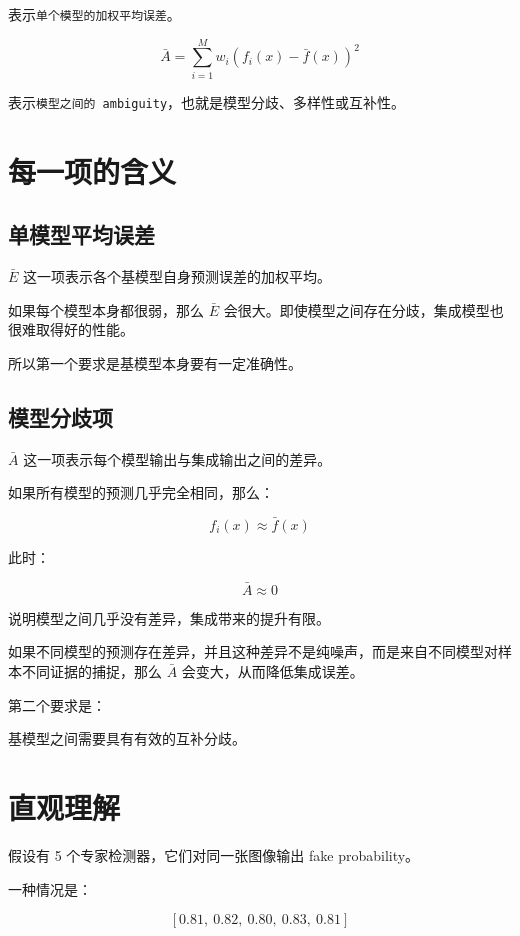 表示\verb|单个模型的加权平均误差|。

\[
\bar{A} = \sum_{i=1}^{M} w_i\left(f_i(x)-\bar{f}(x)\right)^2
\]

表示\verb|模型之间的 ambiguity|，也就是模型分歧、多样性或互补性。

\section{每一项的含义}

\subsection{单模型平均误差}

\(\bar{E}\) 这一项表示各个基模型自身预测误差的加权平均。

如果每个模型本身都很弱，那么 \(\bar{E}\) 会很大。即使模型之间存在分歧，集成模型也很难取得好的性能。

所以第一个要求是基模型本身要有一定准确性。

\subsection{模型分歧项}

\(\bar{A}\) 这一项表示每个模型输出与集成输出之间的差异。

如果所有模型的预测几乎完全相同，那么：

\[
f_i(x) \approx \bar{f}(x)
\]

此时：

\[
\bar{A} \approx 0
\]

说明模型之间几乎没有差异，集成带来的提升有限。

如果不同模型的预测存在差异，并且这种差异不是纯噪声，而是来自不同模型对样本不同证据的捕捉，那么 \(\bar{A}\) 会变大，从而降低集成误差。

第二个要求是：

\begin{center}
\textcolor{mdc1}{基模型之间需要具有有效的互补分歧。}
\end{center}

\section{直观理解}

假设有 5 个专家检测器，它们对同一张图像输出 fake probability。

一种情况是：

\[
[0.81,\ 0.82,\ 0.80,\ 0.83,\ 0.81]
\]

